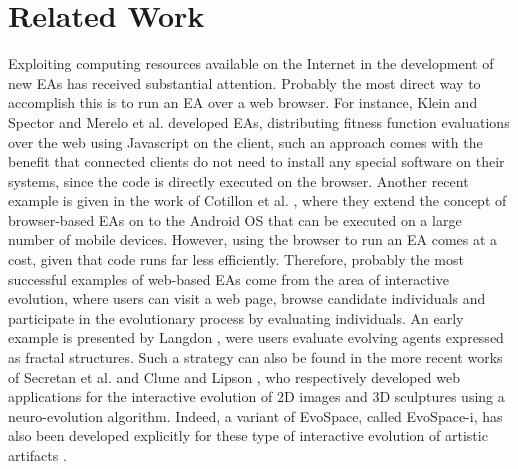\section{Related Work}
\label{sec:related}
Exploiting computing resources available on the Internet in the
development of  new EAs %
 has received substantial attention. Probably the most direct way to accomplish this is to run an EA over a web browser.
For instance, Klein and Spector \cite{spector:2007} and Merelo et al. \cite{merelo:2008} developed EAs, distributing fitness function evaluations over the web using Javascript on the client, such an approach comes with the benefit that connected clients do not need to install any special software on their systems, since the code is directly executed on the browser.
Another recent example is given in the work of Cotillon et al. \cite{cotillon:2012}, where they extend the concept of browser-based EAs on to the Android OS that can be
executed on a large number of mobile devices.
However, using the browser to run an EA comes at a cost, given that
code runs far less efficiently. %
Therefore, probably the most successful examples of web-based EAs come
from the area of interactive evolution, %
where users can visit a web page, browse candidate individuals and participate in the evolutionary process by evaluating individuals.
An early example is presented by Langdon \cite{langdon:2004}, were users evaluate evolving agents expressed as fractal structures.
Such a strategy can also be found in the more recent works of Secretan et al. \cite{picbreeder} and Clune and Lipson \cite{forms}, who respectively developed web applications for the interactive
evolution of 2D images and 3D sculptures using a neuro-evolution algorithm.
Indeed, a variant of EvoSpace, called EvoSpace-i, has also been developed explicitly for these type of interactive evolution of artistic artifacts \cite{Musart,Fire}.


